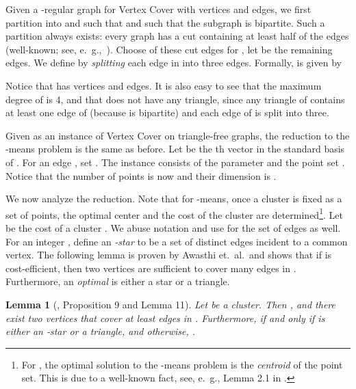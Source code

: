 \documentclass{scrartcl}
\newtheorem{lemma}[theorem]{Lemma}
\begin{document}
Given a -regular graph  for Vertex Cover with  vertices and  edges, 
we first partition  into  and  such that  and such that the subgraph  is bipartite. 
Such a partition always exists: every graph has a cut containing at least half of the edges (well-known; see, e.~g.,~\cite{MU05}). Choose  of these cut edges for , let  be the remaining edges.
We define  by {\em splitting} each edge in  into three edges.
Formally,  is given by  

Notice that  has  vertices and  edges. 
It is also easy to see that the maximum degree of  is 4, and that  does not have any triangle, since any triangle of  contains at least one edge of  (because  is bipartite) and each edge of  is split into three. 

Given  as an instance of Vertex Cover on triangle-free graphs, the reduction to the -means problem is the same as before. 
Let  be the th vector in the standard basis of . For an edge , set . The instance consists of the parameter  and the point set . Notice that the number of points is now  and their dimension is . 

We now analyze the reduction. 
Note that for -means, once a cluster is fixed as a set of points, the optimal center and the cost of the cluster are determined\footnote{For , the optimal solution to the -means problem is the \emph{centroid} of the point set. This is due to a well-known fact, see, e.\ g., Lemma 2.1 in \cite{KMNPSW04}.}. 
Let  be the cost of a cluster . 
We abuse notation and use  for the set of edges  as well. 
For an integer , define an \emph{-star} to be a set of  distinct edges incident to a common vertex. 
The following lemma is proven by Awasthi et.\ al.\ and shows that if  is cost-efficient, then two vertices are sufficient to cover many edges in . Furthermore, an {\em optimal}  is either a star or a triangle. 

\begin{lemma}[\cite{ACKS15}, Proposition 9 and Lemma 11]\label{lem:cost}
Let  be a cluster. 
Then , and there exist two vertices that cover at least  edges in .
Furthermore,  if and only if  is either an -star or a triangle, and otherwise, .
\end{lemma}
\end{document}
